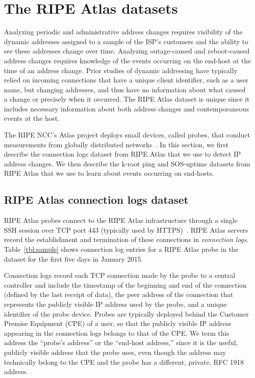 
\section{The RIPE Atlas datasets}
\label{sec:dataset}
Analyzing periodic and administrative address changes
requires visibility of the dynamic addresses assigned to a
sample of the ISP's customers and the ability to see these
addresses change over time. Analyzing outage-caused and
reboot-caused address changes requires knowledge of the
events occurring on the end-host at the time of an address
change. Prior studies of dynamic addressing have typically
relied on incoming connections that have a unique client
identifier, such as a user name, but changing addresses, and
thus have no information about what caused a change or precisely when
it occurred. The RIPE Atlas dataset
is unique since it includes necessary information about both
address changes and contemporaneous events at the host.

The RIPE NCC's Atlas project deploys small devices, called probes, that
conduct measurements from globally distributed
networks~\cite{atlas}. In this section, we first describe the
connection logs dataset from RIPE Atlas that we use to detect IP
address changes. We then describe the k-root ping and SOS-uptime
datasets from RIPE Atlas that we use to learn about events occurring on end-hosts. 

\subsection{RIPE Atlas connection logs dataset}
RIPE Atlas probes connect to the RIPE Atlas infrastructure
through a single SSH session over TCP port 443 (typically used
by HTTPS)~\cite{atlas-faq-tcp443}.  RIPE Atlas servers
record the establishment and
termination of these connections in \emph{connection logs}.
Table~\ref{tbl:sample} shows connection log entries for a
RIPE Atlas probe in the dataset for the first five
days in January 2015.  

Connection logs
record each TCP connection made by the probe to a central
controller and include the timestamp of the beginning and end of the connection (defined by the last receipt of data), %
the peer address of the connection that represents the publicly visible IP
address used by the probe, and a unique identifier of the
probe device.  Probes are typically deployed behind the Customer
Premise Equipment (CPE) of a user, so that the publicly visible IP address
appearing in the connection logs belongs to that of the
CPE.  We term this address the ``probe's address'' or the ``end-host address,''
since it is the useful, publicly visible address that the probe uses, even though the address
may technically belong to the CPE and the probe has a different, private, RFC 1918 address.


